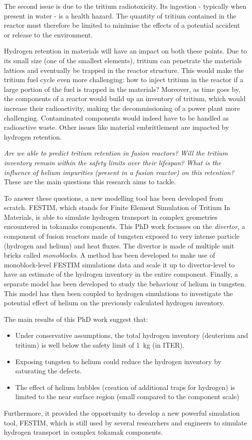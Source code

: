 The second issue is due to the tritium radiotoxicity.
Its ingestion - typically when present in water - is a health hazard.
The quantity of tritium contained in the reactor must therefore be limited to minimise the effects of a potential accident or release to the environment.

Hydrogen retention in materials will have an impact on both these points.
Due to its small size (one of the smallest elements), tritium can penetrate the materials lattices and eventually be trapped in the reactor structure.
This would make the tritium fuel cycle even more challenging: how to inject tritium in the reactor if a large portion of the fuel is trapped in the materials?
Moreover, as time goes by, the components of a reactor would build up an inventory of tritium, which would increase their radioactivity, making the decommissioning of a power plant more challenging.
Contaminated components would indeed have to be handled as radioactive waste.
Other issues like material embrittlement are impacted by hydrogen retention.

\emph{Are we able to predict tritium retention in fusion reactors?}\newline
\emph{Will the tritium inventory remain within the safety limits over their lifespan?}\newline
\emph{What is the influence of helium impurities (present in a fusion reactor) on this retention?}\newline
These are the main questions this research aims to tackle.

To answer these questions, a new modelling tool has been developed from scratch.
FESTIM, which stands for Finite Element Simulation of Tritium In Materials, is able to simulate hydrogen transport in complex geometries encountered in tokamaks components.
This PhD work focusses on the \textit{divertor}, a component of fusion reactors made of tungsten exposed to very intense particle (hydrogen and helium) and heat fluxes. 
The divertor is made of multiple unit bricks called \textit{monoblocks}.
A method has been developed to make use of monoblock-level FESTIM simulations data and scale it up to divertor-level to have an estimate of the hydrogen inventory in the entire component.
Finally, a separate model has been developed to study the behaviour of helium in tungsten.
This model has then been coupled to hydrogen simulations to investigate the potential effect of helium on the previously calculated hydrogen inventory.

The main results of this PhD work suggest that:
\begin{itemize}
    \item Under conservative assumptions, the total hydrogen inventory (deuterium and tritium) is well below the safety limit of \SI{1}{kg} (in ITER).
    \item Exposing tungsten to helium could reduce the hydrogen inventory by saturating the defects.
    \item The effect of helium bubbles (creation of additional traps for hydrogen) is limited to the near surface region (small compared to the component scale)
\end{itemize}

Furthermore, it provided the opportunity to develop a new powerful simulation tool, FESTIM, which is still used by several researchers and engineers to simulate hydrogen transport in complex tokamak components.
